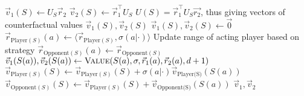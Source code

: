 \begin{algorithm}[!htbp]
\begin{algorithmic}[1]
 
        \State $\vec{v}_1(S) \gets U_S\vec{r}_2$ 
        \State $\vec{v}_2(S) \gets \vec{r}_1^\intercal U_S$ \hspace*{\fill}$U(S) = \vec{r}_1^\intercal U_S \vec{r_2}$, thus giving vectors of counterfactual values
        \State \Return $\vec{v}_1(S),\vec{v}_2(S)$
        \State \Return {}
    \EndIf
    \State $\vec{v}_1(S), \vec{v}_2(S) \gets \vec{0}$
        \State $\vec{r}_{\text{Player}(S)}(a) \gets \langle \vec{r}_{\text{Player}(S)}, \sigma(a|\cdot) \rangle$
            \Comment Update range of acting player based on strategy
        \State $\vec{r}_{\text{Opponent}(S)}(a) \gets \vec{r}_{\text{Opponent}(S)}$
        \State $\vec{v}_1(S(a)), \vec{v}_2(S(a)) \gets \Call{Value}{S(a),\sigma,\vec{r}_1(a),\vec{r}_2(a),d+1}$
        \State $\vec{v}_{\text{Player}(S)}(S) \gets \vec{v}_{\text{Player}(S)}(S) + \sigma(a|\cdot)\vec{v}_{\text{Player(S)}}(S(a))$
        \State $\vec{v}_{\text{Opponent}(S)}(S) \gets \vec{v}_{\text{Player}(S)}(S) + \vec{v}_{\text{Opponent(S)}}(S(a))$
            \Statex{}
    \EndFor
    \State \Return $\vec{v}_1, \vec{v}_2$
\EndFunction
{}
\end{algorithmic}
\end{algorithm}

